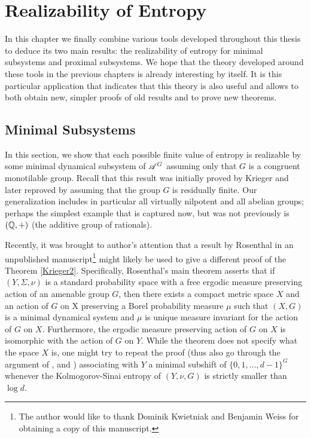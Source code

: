 \chapter{Realizability of Entropy}\label{chapter:krieger}

In this chapter we finally combine various tools developed throughout this thesis to deduce its two main results: the realizability of entropy for minimal subsystems and proximal subsystems. 
%
We hope that the theory developed around these tools in the previous chapters is already interesting by itself. It is this particular application that indicates that this theory is also useful and allows to both obtain new, simpler proofs of old results and to prove new theorems.

\section{Minimal Subsystems}
In this section, we show that each possible finite value of entropy is realizable by some minimal dynamical subsystem of $\mathscr{A}^G$ assuming only that $G$ is a congruent monotilable group.
%
Recall that this result was initially proved by Krieger \cite{Krieger07} and later reproved by \cite{LS18} assuming that the group $G$ is residually finite.
%
Our generalization  includes in particular all virtually nilpotent and all abelian groups; perhaps the simplest example that is captured now, but was not previously is $(\mathbb{Q}, +)$ (the additive group of rationals).

Recently, it was brought to author's attention that a result by Rosenthal in an unpublished  manuscript\footnote{The author would like to thank Dominik Kwietniak and Benjamin Weiss for obtaining a copy of this manuscript.}  \cite{Rosenthal} might likely be used to give a different proof of the Theorem \ref{Krieger2}.  
%
Specifically, Rosenthal's main theorem asserts that if $(Y,\Sigma,\nu)$ is a standard probability space with a free ergodic measure preserving action of an amenable group $G$, then there exists a compact
metric space $X$ and an action of $G$ on X preserving a Borel probability measure $\mu$ such that $(X,G)$ is a minimal dynamical system and $\mu$ is unique measure invariant for the action of $G$ on $X$. 
%
Furthermore, the ergodic measure preserving action of $G$ on $X$ is isomorphic with the action of $G$ on $Y$.
%
While the theorem does not specify what the space $X$ is, one might try to repeat the proof (thus also go through the argument of \cite{HR73}, \cite{Rosenthal89} and \cite{Weiss85}) associating with $Y$ a minimal subshift of $\{0,1,\ldots,d-1\}^G$ whenever the Kolmogorov-Sinai entropy of $(Y,\nu,G)$ is strictly smaller than $\log d$.

